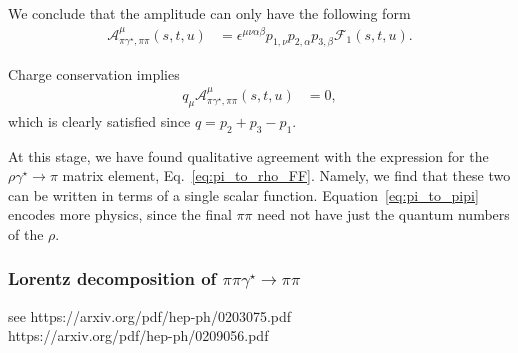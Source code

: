 We conclude that the amplitude can only have the following form
\begin{align}
\mathcal{A}^{\mu}_{\pi\gamma^\star,\pi\pi}(s,t,u)&=
\epsilon^{\mu\nu\alpha\beta}p_{1,\nu}p_{2,\alpha}p_{3,\beta}\mathcal{F}_{1}(s,t,u).
\label{eq:pi_to_pipi}
\end{align}



Charge conservation implies
\begin{align}
q_\mu\mathcal{A}^{\mu}_{\pi\gamma^\star,\pi\pi}(s,t,u)&=0,
\end{align}
which is clearly satisfied since $q=p_{2}+p_{3}-p_{1}$. 

At this stage, we have found qualitative agreement with the expression for the $\rho\gamma^\star\to\pi$ matrix element, Eq.~\ref{eq:pi_to_rho_FF}. Namely, we find that these two can be written in terms of a single scalar function. Equation~\ref{eq:pi_to_pipi} encodes more physics, since the final $\pi\pi$ need not have just the quantum numbers of the $\rho$. 

\subsubsection{Lorentz decomposition of $\pi\pi\gamma^\star\to\pi\pi$}
{\raul see https://arxiv.org/pdf/hep-ph/0203075.pdf\\
https://arxiv.org/pdf/hep-ph/0209056.pdf}

